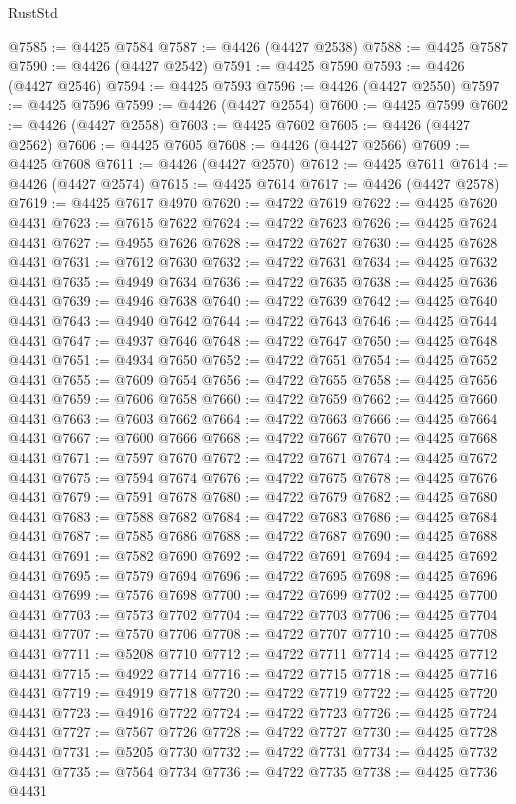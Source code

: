 \begin{lexlean}{RustStd}
\begin{coremodule}
@7585 := @4425 @7584
@7587 := @4426 (@4427 @2538)
@7588 := @4425 @7587
@7590 := @4426 (@4427 @2542)
@7591 := @4425 @7590
@7593 := @4426 (@4427 @2546)
@7594 := @4425 @7593
@7596 := @4426 (@4427 @2550)
@7597 := @4425 @7596
@7599 := @4426 (@4427 @2554)
@7600 := @4425 @7599
@7602 := @4426 (@4427 @2558)
@7603 := @4425 @7602
@7605 := @4426 (@4427 @2562)
@7606 := @4425 @7605
@7608 := @4426 (@4427 @2566)
@7609 := @4425 @7608
@7611 := @4426 (@4427 @2570)
@7612 := @4425 @7611
@7614 := @4426 (@4427 @2574)
@7615 := @4425 @7614
@7617 := @4426 (@4427 @2578)
@7619 := @4425 @7617 @4970
@7620 := @4722 @7619
@7622 := @4425 @7620 @4431
@7623 := @7615 @7622
@7624 := @4722 @7623
@7626 := @4425 @7624 @4431
@7627 := @4955 @7626
@7628 := @4722 @7627
@7630 := @4425 @7628 @4431
@7631 := @7612 @7630
@7632 := @4722 @7631
@7634 := @4425 @7632 @4431
@7635 := @4949 @7634
@7636 := @4722 @7635
@7638 := @4425 @7636 @4431
@7639 := @4946 @7638
@7640 := @4722 @7639
@7642 := @4425 @7640 @4431
@7643 := @4940 @7642
@7644 := @4722 @7643
@7646 := @4425 @7644 @4431
@7647 := @4937 @7646
@7648 := @4722 @7647
@7650 := @4425 @7648 @4431
@7651 := @4934 @7650
@7652 := @4722 @7651
@7654 := @4425 @7652 @4431
@7655 := @7609 @7654
@7656 := @4722 @7655
@7658 := @4425 @7656 @4431
@7659 := @7606 @7658
@7660 := @4722 @7659
@7662 := @4425 @7660 @4431
@7663 := @7603 @7662
@7664 := @4722 @7663
@7666 := @4425 @7664 @4431
@7667 := @7600 @7666
@7668 := @4722 @7667
@7670 := @4425 @7668 @4431
@7671 := @7597 @7670
@7672 := @4722 @7671
@7674 := @4425 @7672 @4431
@7675 := @7594 @7674
@7676 := @4722 @7675
@7678 := @4425 @7676 @4431
@7679 := @7591 @7678
@7680 := @4722 @7679
@7682 := @4425 @7680 @4431
@7683 := @7588 @7682
@7684 := @4722 @7683
@7686 := @4425 @7684 @4431
@7687 := @7585 @7686
@7688 := @4722 @7687
@7690 := @4425 @7688 @4431
@7691 := @7582 @7690
@7692 := @4722 @7691
@7694 := @4425 @7692 @4431
@7695 := @7579 @7694
@7696 := @4722 @7695
@7698 := @4425 @7696 @4431
@7699 := @7576 @7698
@7700 := @4722 @7699
@7702 := @4425 @7700 @4431
@7703 := @7573 @7702
@7704 := @4722 @7703
@7706 := @4425 @7704 @4431
@7707 := @7570 @7706
@7708 := @4722 @7707
@7710 := @4425 @7708 @4431
@7711 := @5208 @7710
@7712 := @4722 @7711
@7714 := @4425 @7712 @4431
@7715 := @4922 @7714
@7716 := @4722 @7715
@7718 := @4425 @7716 @4431
@7719 := @4919 @7718
@7720 := @4722 @7719
@7722 := @4425 @7720 @4431
@7723 := @4916 @7722
@7724 := @4722 @7723
@7726 := @4425 @7724 @4431
@7727 := @7567 @7726
@7728 := @4722 @7727
@7730 := @4425 @7728 @4431
@7731 := @5205 @7730
@7732 := @4722 @7731
@7734 := @4425 @7732 @4431
@7735 := @7564 @7734
@7736 := @4722 @7735
@7738 := @4425 @7736 @4431

\end{coremodule}
\end{lexlean}
